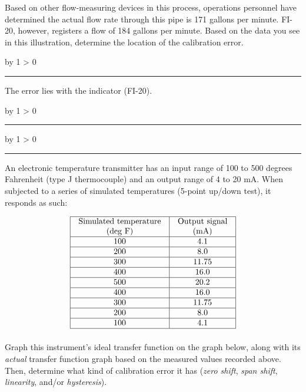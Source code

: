 \documentclass[12pt,a4paper]{article}
\def\oppgave{
            \advance\questnum by 1
            \ifnum \questnum > 0
                 \hrule
                 \vskip 3pt
                 \leftline{Oppgave \the\questnum}
                 \vskip 3pt \fi}
\def\svar{
           \advance\answnum by 1
           \ifnum \answnum > 0
                \hrule
                \vskip 3pt
                \leftline{Svar \the\answnum}
                \vskip 3pt \fi}
\def\notes{
           \advance\explnum by 1
           \ifnum \explnum > 0
                \hrule
                \vskip 3pt
                \leftline{Notes \the\explnum}
                \vskip 3pt \fi}
\begin{document}
Based on other flow-measuring devices in this process, operations personnel have determined the actual flow rate through this pipe is 171 gallons per minute.  FI-20, however, registers a flow of 184 gallons per minute.  Based on the data you see in this illustration, determine the location of the calibration error.

\vskip 10pt \filbreak 





\svar{} 

The error lies with the indicator (FI-20).

\vskip 10pt \filbreak 





\notes{} 



\vfil \eject 


\oppgave{} 

An electronic temperature transmitter has an input range of 100 to 500 degrees Fahrenheit (type J thermocouple) and an output range of 4 to 20 mA.  When subjected to a series of simulated temperatures (5-point up/down test), it responds as such:


$$\vbox{\offinterlineskip
\halign{\strut
\vrule \quad\hfil # \ \hfil & 
\vrule \quad\hfil # \ \hfil \vrule \cr
\noalign{\hrule}
%
Simulated temperature & Output signal \cr
%
(deg F) & (mA) \cr
%
\noalign{\hrule}
%
100 & 4.1 \cr
%
\noalign{\hrule}
%
200 & 8.0 \cr
%
\noalign{\hrule}
%
300 & 11.75 \cr
%
\noalign{\hrule}
%
400 & 16.0 \cr
%
\noalign{\hrule}
%
500 & 20.2 \cr
%
\noalign{\hrule}
%
400 & 16.0 \cr
%
\noalign{\hrule}
%
300 & 11.75 \cr
%
\noalign{\hrule}
%
200 & 8.0 \cr
%
\noalign{\hrule}
%
100 & 4.1 \cr
%
\noalign{\hrule}
} %
}$$ %

Graph this instrument's ideal transfer function on the graph below, along with its {\it actual} transfer function graph based on the measured values recorded above.  Then, determine what kind of calibration error it has ({\it zero shift}, {\it span shift}, {\it linearity}, and/or {\it hysteresis}).
\end{document}
